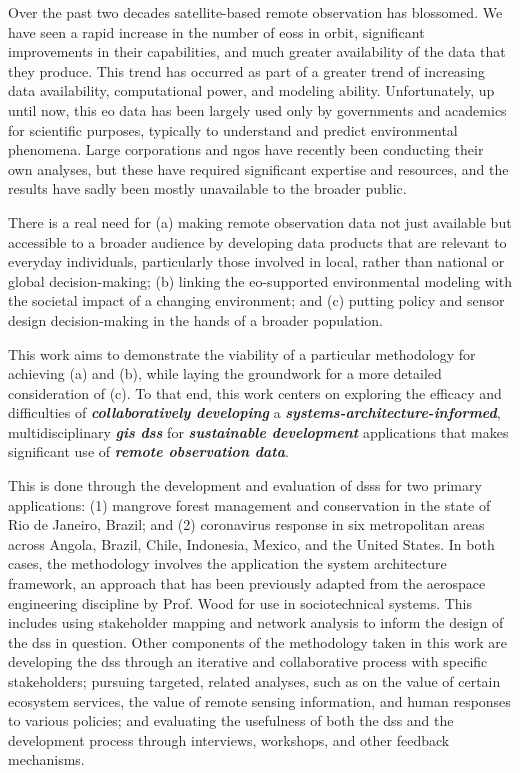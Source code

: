 \documentclass[notitlepage]{report}
\begin{document}
\vspace{-1.0cm}
Over the past two decades satellite-based remote observation has blossomed. We have seen a rapid increase in the number of \acp{eos} in orbit, significant improvements in their capabilities, and much greater availability of the data that they produce. This trend has occurred as part of a greater trend of increasing data availability, computational power, and modeling ability. Unfortunately, up until now, this \ac{eo} data has been largely used only by governments and academics for scientific purposes, typically to understand and predict environmental phenomena. Large corporations and \acp{ngo} have recently been conducting their own analyses, but these have required significant expertise and resources, and the results have sadly been mostly unavailable to the broader public. 

There is a real need for (a) making remote observation data not just available but accessible to a broader audience by developing data products that are relevant to everyday individuals, particularly those involved in local, rather than national or global decision-making; (b) linking the \ac{eo}-supported environmental modeling with the societal impact of a changing environment; and (c) putting policy and sensor design decision-making in the hands of a broader population. 

This work aims to demonstrate the viability of a particular methodology for achieving (a) and (b), while laying the groundwork for a more detailed consideration of (c). To that end, this work centers on exploring the efficacy and difficulties of \textbf{\textit{collaboratively developing}} a \textbf{\textit{systems-architecture-informed}}, multidisciplinary \textbf{\textit{\ac{gis} \ac{dss}}} for \textbf{\textit{sustainable development}} applications that makes significant use of \textbf{\textit{remote observation data}}. 

This is done through the development and evaluation of \acp{dss} for two primary applications: (1) mangrove forest management and conservation in the state of Rio de Janeiro, Brazil; and (2) coronavirus response in six metropolitan areas across Angola, Brazil, Chile, Indonesia, Mexico, and the United States. In both cases, the methodology involves the application the system architecture framework, an approach that has been previously adapted from the aerospace engineering discipline by Prof. Wood for use in sociotechnical systems. This includes using stakeholder mapping and network analysis to inform the design of the \ac{dss} in question. Other components of the methodology taken in this work are developing the \ac{dss} through an iterative and collaborative process with specific stakeholders; pursuing targeted, related analyses, such as on the value of certain ecosystem services, the value of remote sensing information, and human responses to various policies; and evaluating the usefulness of both the \ac{dss} and the development process through interviews, workshops, and other feedback mechanisms.
\end{document}
